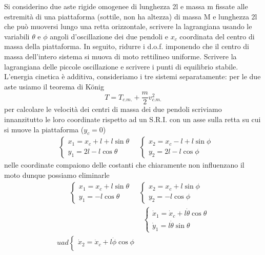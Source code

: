 \documentclass[
10pt, %
a4paper, %
oneside, %
headinclude,footinclude, %
BCOR5mm, %
]{scrartcl}
\begin{document}
\begin{esercizio}
Si considerino due aste rigide omogenee di lunghezza 2l e massa m fissate alle estremità di una piattaforma (sottile, non ha altezza) di massa M e lunghezza 2l che può muoversi lungo una retta orizzontale, scrivere la lagrangiana usando le variabili $\theta$ e $\phi$ angoli d'oscillazione dei due pendoli e \(x_c\) coordinata del centro di massa della piattaforma. In seguito, ridurre i d.o.f. imponendo che il centro di massa dell'intero sistema si muova di moto rettilineo uniforme. Scrivere la lagrangiana delle piccole oscillazione e scrivere i punti di equilibrio stabile.\\
	L'energia cinetica è additiva, consideriamo i tre sistemi separatamente: per le due aste usiamo il teorema di K\"onig
	\[T = T_{c.m.}+\frac{m}{2}v_{c.m.}^2\]
	per calcolare le velocità dei centri di massa dei due pendoli scriviamo innanzitutto le loro coordinate rispetto ad un S.R.I. con un asse sulla retta su cui si muove la piattaforma (\(y_c = 0\))
	\begin{align*}
		&\begin{cases}
			x_1 = x_c +l + l\sin\theta\\
			y_1 = 2l-l\cos\theta
		\end{cases}\quad
		\begin{cases}
			x_2 = x_c - l +l\sin\phi\\
			y_2 = 2l - l\cos\phi
		\end{cases}
	\end{align*}
	nelle coordinate compaiono delle costanti che chiaramente non influenzano il moto dunque possiamo eliminarle
	\begin{align*}
		&\begin{cases}
			x_1 = x_c+ l\sin\theta\\
			y_1 = -l\cos\theta
		\end{cases}\quad
		\begin{cases}
			x_2 = x_c +l\sin\phi\\
			y_2 = - l\cos\phi
		\end{cases}
	\end{align*}
\begin{align*}
	&\begin{cases}
		\dot{x}_1 = \dot{x}_c+ l\dot{\theta}\cos\theta\\
		\dot{y}_1 = l\dot{\theta}\sin\theta
	\end{cases}\\uad
	\begin{cases}
		\dot{x}_2 = \dot{x}_c +l\dot{\phi}\cos\phi\\

\end{cases}
\end{align*}
\end{esercizio}
\end{document}
